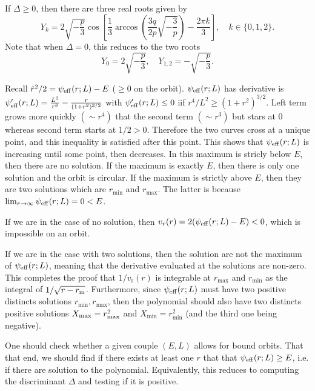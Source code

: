 \documentclass[11pt]{article}
\newcommand{\rr}{\mathrm{r}}
\newcommand{\vr}{v_{\rr}}
\newcommand{\rmax}{r_{\max}}
\newcommand{\rmin}{r_{\min}}
\newcommand{\psieff}{\psi_{\rm{eff}}}
\begin{document}
If $\Delta\geq0$, then there are three
real roots given by
\begin{equation}
Y_{k}=2\sqrt{-\frac{p}{3}}\cos\left[\frac{1}{3}\arccos\left(\frac{3q}{2p}\sqrt{-\frac{3}{p}}\right)-\frac{2\pi k}{3}\right],\quad k\in\{0,1,2\}.
\label{eq:Pos_discriminant}
\end{equation}
Note that when $\Delta=0$, this reduces to the two roots 
\begin{equation}
Y_{0}=2\sqrt{-\frac{p}{3}},\quad Y_{1,2}=-\sqrt{-\frac{p}{3}}.
\label{eq:Null_discriminant}
\end{equation}

 Recall $\dot{r}^{2}/2=\psieff(r;L)-E$ ($\geq0$ on the
orbit). $\psieff(r;L)$ has derivative is $\psieff'(r;L)=\frac{L^{2}}{r^{3}}-\frac{r}{(1+r^{2})^{3/2}}$
with $\psieff'(r;L)\leq0$ iif $r^{4}/L^{2}\geq(1+r^{2})^{3/2}$.
Left term grows more quickly $(\sim r^{4})$ that the second term
$(\sim r^{3})$ but stars at 0 whereas second term starts at $1/2>0$.
Therefore the two curves cross at a unique point, and this inequality
is satisfied after this point. This shows that $\psieff(r;L)$
is increasing until some point, then decreases. In this maximum is
stricly below $E$, then there are no solution. If the maximum is
exactly $E$, then there is only one solution and the orbit is circular.
If the maximum is strictly above $E$, then they are two solutions
which are $\rmin$ and $\rmax$. The latter is because $\lim_{r\rightarrow\infty}\psieff(r;L)=0<E$. 

If we are in the case of no solution, then $v_{r}(r)=2(\psieff(r;L)-E)<0$,
which is impossible on an orbit.

If we are in the case with two solutions, then the solution are not
the maximum of $\psieff(r;L)$, meaning that the derivative
evaluated at the solutions are non-zero. This completes the proof
that $1/\vr(r)$ is integrable at $\rmax$ and $\rmin$ as
the integral of $1/\sqrt{r-r_{{\rm m}}}$. Furthermore, since $\psieff(r;L)$
must have two positive distincts solutions $\rmin,\rmax$, then
the polynomial should also have two distincts positive solutions $X_{{\rm max}}=\rmax^{2}$
and $X_{\min}=\rmin^{2}$ (and the third one being negative).

One should check whether a given couple $(E,L)$ allows for bound
orbits. That that end, we should find if there exists at least one
$r$ that that $\psieff(r;L)\geq E$, i.e. if there are solution
to the polynomial. Equivalently, this reduces to computing the discriminant
$\Delta$ and testing if it is positive.
\end{document}
